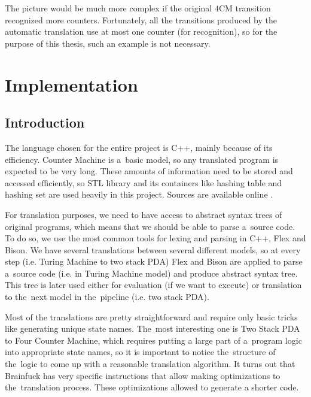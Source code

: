 \documentclass[english,shortabstract,mgr]{iithesis}
\begin{document}
The picture would be much more complex if the original $4$CM transition
recognized more counters. Fortunately, all the transitions produced by
the automatic translation use at most one counter (for recognition),
so for the purpose of this thesis, such an example is not necessary.

\chapter{Implementation}

\section{Introduction}

The language chosen for the entire project is C++, mainly because of its efficiency. Counter Machine
is a~basic model, so any translated program is expected to be very long. These amounts of information
need to be stored and accessed efficiently, so STL library and its containers like hashing table
and hashing set are used heavily in this project. Sources are available online \cite{github}.

For translation purposes, we need to have access to abstract syntax trees of original programs, which
means that we should be able to parse a~source code. To do so, we use the most common tools
for lexing and parsing in C++, Flex and Bison. We have several translations
between several different models, so at every step (i.e. Turing Machine to two stack PDA) Flex and Bison
are applied to parse a~source code (i.e. in Turing Machine model) and produce abstract syntax tree.
This tree is later used either for evaluation (if we want to execute) or translation to the~next
model in the~pipeline (i.e. two stack PDA).

Most of the translations are pretty straightforward and require only basic tricks like
generating unique state names. The~most interesting one is Two Stack PDA to Four Counter Machine,
which requires putting a large part of a~program logic into appropriate state names, so it is important
to notice the~structure of the~logic to come up with a reasonable translation algorithm.
It turns out that Brainfuck has very specific instructions that allow making optimizations
to the~translation process. These optimizations allowed to generate a shorter
code.
\end{document}
